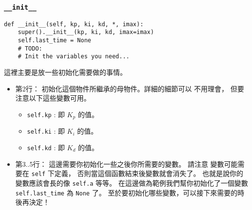 \documentclass[12pt, a4paper]{article}
\begin{document}
\subsubsection{\texttt{\_\_init\_\_}}
\begin{verbatim}
def __init__(self, kp, ki, kd, *, imax):
    super().__init__(kp, ki, kd, imax=imax)
    self.last_time = None
    # TODO:
    # Init the variables you need...
\end{verbatim}
這裡主要是放一些初始化需要做的事情。
\begin{itemize}
  \itemsep=0pt
  \item 第2行： 初始化這個物件所繼承的母物件。詳細的細節可以
    不用理會， 但要注意以下這些變數可用。
    \begin{itemize}
      \item \texttt{self.kp} : 即 $K_p$ 的值。
      \item \texttt{self.ki} : 即 $K_i$ 的值。
      \item \texttt{self.kd} : 即 $K_d$ 的值。
    \end{itemize}
  \item 第3..5行：
    這邊需要你初始化一些之後你所需要的變數。 請注意
    變數可能需要在 \texttt{self} 下定義，
    否則當這個函數結束後變數就會消失了。
    也就是說你的變數應該會長的像 \texttt{self.a}
    等等。 在這邊做為範例我們幫你初始化了一個變數
    \texttt{self.last_time} 為 
    \texttt{None} 了。
    至於要初始化哪些變數，可以接下來需要的時後再決定！
\end{itemize}
\end{document}

